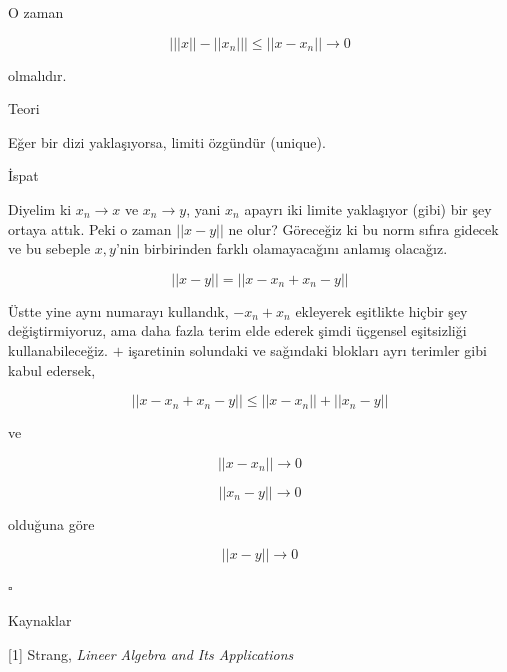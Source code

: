 \documentclass[12pt,fleqn]{article}\usepackage{../../common}
\begin{document}
O zaman 

$$ \bigg| ||x||  - ||x_n|| \bigg|  \le ||x-x_n|| \to 0$$

olmalıdır. 

Teori 

Eğer bir dizi yaklaşıyorsa, limiti özgündür (unique).

İspat

Diyelim ki $x_n \to x$ ve $x_n \to y$, yani $x_n$ apayrı iki limite
yaklaşıyor (gibi) bir şey ortaya attık. Peki o zaman $||x-y||$ ne olur?
Göreceğiz ki bu norm sıfıra gidecek ve bu sebeple $x,y$'nin birbirinden
farklı olamayacağını anlamış olacağız. 

$$ ||x-y|| =  ||x-x_n + x_n-y|| $$

Üstte yine aynı numarayı kullandık, $-x_n+x_n$ ekleyerek eşitlikte hiçbir
şey değiştirmiyoruz, ama daha fazla terim elde ederek şimdi üçgensel
eşitsizliği kullanabileceğiz. $+$ işaretinin solundaki ve sağındaki
blokları ayrı terimler gibi kabul edersek, 

$$ ||x-x_n + x_n-y|| \le ||x-x_n || + ||x_n-y|| $$

ve

$$ ||x-x_n || \to 0 $$

$$ ||x_n-y|| \to 0$$

olduğuna göre 

$$  ||x-y|| \to 0 $$ 

$\square$

Kaynaklar

[1] Strang, {\em Lineer Algebra and Its Applications}
\end{document}
